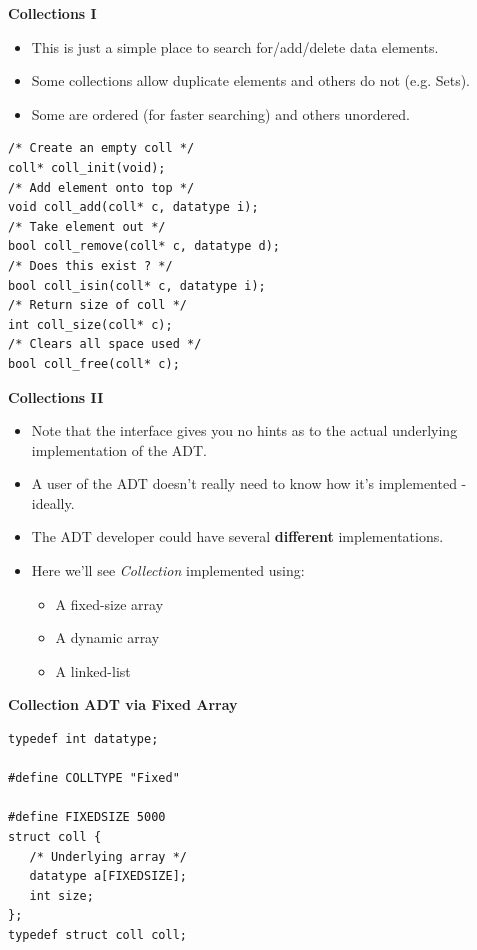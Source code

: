 \documentclass[a4,portraitt]{slides}
\begin{document}
\newpage
{\samepage
\begin{center}
{\Large{\bf Collections I}}
\end{center}
\begin{itemize}
\item This is just a simple place to search for/add/delete data elements.
\item Some collections allow duplicate elements and others do not (e.g. Sets).
\item Some are ordered (for faster searching) and others unordered. 
\end{itemize}
\begin{verbatim}
/* Create an empty coll */
coll* coll_init(void);
/* Add element onto top */
void coll_add(coll* c, datatype i);
/* Take element out */
bool coll_remove(coll* c, datatype d);
/* Does this exist ? */
bool coll_isin(coll* c, datatype i);
/* Return size of coll */
int coll_size(coll* c);
/* Clears all space used */
bool coll_free(coll* c);
\end{verbatim}
}

\newpage
{\samepage
\begin{center}
{\Large{\bf Collections II}}
\end{center}
\begin{itemize}
\item Note that the interface gives you no hints as to the actual underlying
implementation of the ADT.
\item A user of the ADT doesn't really need to know how it's
implemented - ideally.
\item The ADT developer could have several {\bf different} implementations.
\item Here we'll see {\em Collection} implemented using:
\begin{itemize}
\item A fixed-size array
\item A dynamic array
\item A linked-list
\end{itemize}
\end{itemize}
}

\newpage
{\samepage
\begin{center}
{\large{\bf Collection ADT via Fixed Array}}
\end{center}
\begin{verbatim}
typedef int datatype;

#define COLLTYPE "Fixed"

#define FIXEDSIZE 5000
struct coll {
   /* Underlying array */
   datatype a[FIXEDSIZE];
   int size;
};
typedef struct coll coll;
\end{verbatim}
}
\end{document}
